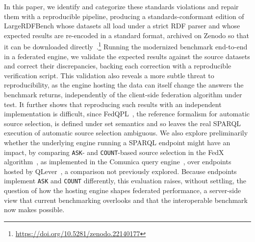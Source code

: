 In this paper, we identify and categorize these standards violations and repair them with a reproducible pipeline, producing a standards-conformant edition of LargeRDFBench whose datasets all load under a strict \ac{RDF} parser and whose expected results are re-encoded in a standard format, archived on Zenodo so that it can be downloaded directly~\cite{tam2026lrbedition}.\footnote{\url{https://doi.org/10.5281/zenodo.22140177}}
Running the modernized benchmark end-to-end in a federated engine, we validate the expected results against the source datasets and correct their discrepancies, backing each correction with a reproducible verification script.
This validation also reveals a more subtle threat to reproducibility, as the engine hosting the data can itself change the answers the benchmark returns, independently of the client-side federation algorithm under test.
It further shows that reproducing such results with an independent implementation is difficult, since FedQPL~\cite{Cheng2021}, the reference formalism for automatic source selection, is defined under set semantics and so leaves the real SPARQL execution of automatic source selection ambiguous.
We also explore preliminarily whether the underlying engine running a SPARQL endpoint might have an impact, by comparing \texttt{ASK}- and \texttt{COUNT}-based source selection in the FedX algorithm~\cite{schwarte2011fedx}, as implemented in the Comunica query engine~\cite{taelman_iswc_resources_comunica_2018}, over endpoints hosted by QLever~\cite{bast2017qlever}, a comparison not previously explored.
Because endpoints implement \texttt{ASK} and \texttt{COUNT} differently, this evaluation raises, without settling, the question of how the hosting engine shapes federated performance, a server-side view that current benchmarking overlooks and that the interoperable benchmark now makes possible.
